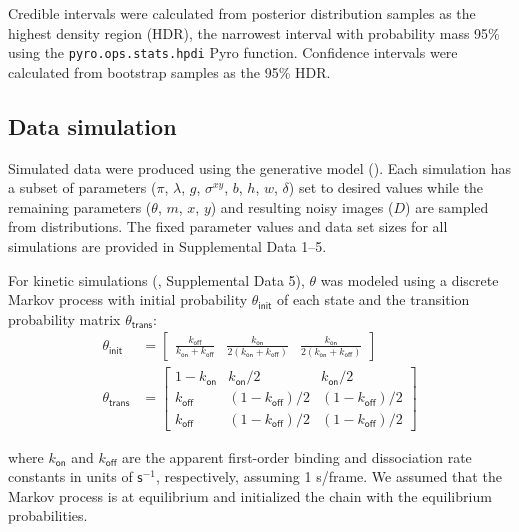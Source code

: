 Credible intervals were calculated from posterior distribution samples as the highest density region (HDR), the narrowest interval with probability mass 95\% using the \texttt{pyro.ops.stats.hpdi} Pyro function. Confidence intervals were calculated from bootstrap samples as the 95\% HDR.

\subsection{Data simulation}

Simulated data were produced using the generative model (). Each simulation has a subset of parameters ($\pi$, $\lambda$, $g$, $\sigma^{xy}$, $b$, $h$, $w$, $\delta$) set to desired values while  the remaining parameters ($\theta$, $m$, $x$, $y$) and resulting noisy images ($D$) are sampled from distributions. The fixed parameter values and data set sizes for all simulations are provided in Supplemental Data 1--5.

For kinetic simulations (, Supplemental Data 5), $\theta$ was modeled using a discrete Markov process with initial probability $\theta_\mathsf{init}$ of each state and the transition probability matrix $\theta_\mathsf{trans}$:
%
\begin{subequations}
\begin{align}
    \theta_\mathsf{init} &= \begin{bmatrix} \frac{k_\mathsf{off}}{k_\mathsf{on} + k_\mathsf{off}} & \frac{k_\mathsf{on}}{2\left( k_\mathsf{on} + k_\mathsf{off} \right)} & \frac{k_\mathsf{on}}{2\left( k_\mathsf{on} + k_\mathsf{off} \right)} \end{bmatrix} \\
    \theta_\mathsf{trans} &= \begin{bmatrix} 1 - k_\mathsf{on} & k_\mathsf{on}/2 & k_\mathsf{on}/2 \\ k_\mathsf{off} & (1 - k_\mathsf{off})/2 & (1 - k_\mathsf{off})/2 \\ k_\mathsf{off} & (1 - k_\mathsf{off})/2 & (1 - k_\mathsf{off})/2 \end{bmatrix}
\end{align}
\end{subequations}

\noindent
where $k_{\mathsf{on}}$ and $k_{\mathsf{off}}$ are the apparent first-order binding and dissociation rate constants in units of $\mathsf{s}^{-1}$, respectively, assuming 1 s/frame. We assumed that the Markov process is at equilibrium and initialized the chain with the equilibrium probabilities.

